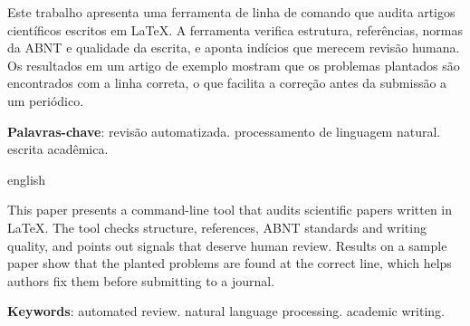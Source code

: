 \documentclass[article,12pt,oneside,a4paper,english,brazil,sumario=tradicional]{abntex2}
\begin{document}
\maketitle

\begin{resumoumacoluna}
Este trabalho apresenta uma ferramenta de linha de comando que audita artigos
científicos escritos em LaTeX. A ferramenta verifica estrutura, referências,
normas da ABNT e qualidade da escrita, e aponta indícios que merecem revisão
humana. Os resultados em um artigo de exemplo mostram que os problemas
plantados são encontrados com a linha correta, o que facilita a correção
antes da submissão a um periódico.

\vspace{\onelineskip}
\noindent
\textbf{Palavras-chave}: revisão automatizada. processamento de linguagem natural. escrita acadêmica.
\end{resumoumacoluna}

\renewcommand{\resumoname}{Abstract}
\begin{otherlanguage*}{english}
\begin{resumoumacoluna}
This paper presents a command-line tool that audits scientific papers written
in LaTeX. The tool checks structure, references, ABNT standards and writing
quality, and points out signals that deserve human review. Results on a sample
paper show that the planted problems are found at the correct line, which helps
authors fix them before submitting to a journal.

\vspace{\onelineskip}
\noindent
\textbf{Keywords}: automated review. natural language processing. academic writing.
\end{resumoumacoluna}
\end{otherlanguage*}

\textual





\postextual

\end{document}
